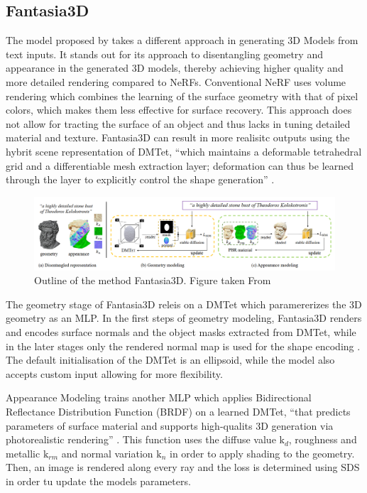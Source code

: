 \subsection{Fantasia3D}\label{fantasia3D}

The model proposed by \citeauthor{chen2023fantasia3d} takes a different approach in generating 3D Models from text inputs. It stands out for its approach to disentangling geometry and appearance in the generated 3D models, thereby achieving higher quality and more detailed rendering compared to NeRFs\@. Conventional NeRF uses volume rendering which combines the learning of the surface geometry with that of pixel colors, which makes them less effective for surface recovery. This approach does not allow for tracting the surface of an object and thus lacks in tuning detailed material and texture. Fantasia3D can result in more realisitc outputs using the hybrit scene representation of DMTet, ``which maintains a deformable tetrahedral grid and a differentiable mesh extraction layer; deformation can thus be learned through the layer to explicitly control the shape generation'' \citep{chen2023fantasia3d}.

\begin{figure}[ht]
    \centering
      \includegraphics[width=1\columnwidth]{figures/Fantasia3D.png}
      \caption{Outline of the method Fantasia3D. Figure taken From \citep{chen2023fantasia3d}}\label{fig:figureFantasia}
\end{figure}

The geometry stage of Fantasia3D releis on a DMTet which paramererizes the 3D geometry as an MLP\@. 
In the first steps of geometry modeling, Fantasia3D renders and encodes surface normals and the object masks extracted from DMTet, while in the later stages only the rendered normal map is used for the shape encoding \citep{chen2023fantasia3d}. The default initialisation of the DMTet is an ellipsoid, while the model also accepts custom input allowing for more flexibility.  


Appearance Modeling trains another MLP which applies Bidirectional Reflectance Distribution Function (BRDF) on a learned DMTet, ``that predicts parameters of surface material and supports high-qualits 3D generation via photorealistic rendering'' \citep{chen2023fantasia3d}. This function uses the diffuse value \(\text{k}_d\), roughness and metallic \(\text{k}_{rm}\) and normal variation \(\text{k}_n\) in order to apply shading to the geometry. Then, an image is rendered along every ray and the loss is determined using SDS in order tu update the models parameters.    


